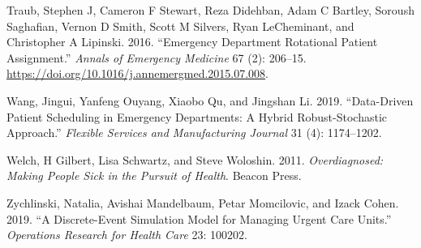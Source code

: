 \documentclass{article}
\newlength{\cslhangindent}
\newlength{\cslentryspacingunit} %
\newenvironment{CSLReferences}[2] %
 {%
  \setlength{\parindent}{0pt}
  \ifodd #1
  \let\oldpar\par
  \def\par{\hangindent=\cslhangindent\oldpar}
  \fi
  \setlength{\parskip}{#2\cslentryspacingunit}
 }%
 {}
\begin{document}
\begin{CSLReferences}{1}{0}
\leavevmode{}%
Traub, Stephen J, Cameron F Stewart, Reza Didehban, Adam C Bartley,
Soroush Saghafian, Vernon D Smith, Scott M Silvers, Ryan LeCheminant,
and Christopher A Lipinski. 2016. {``Emergency Department Rotational
Patient Assignment.''} \emph{Annals of Emergency Medicine} 67 (2):
206--15. \url{https://doi.org/10.1016/j.annemergmed.2015.07.008}.

\leavevmode{}%
Wang, Jingui, Yanfeng Ouyang, Xiaobo Qu, and Jingshan Li. 2019.
{``Data-Driven Patient Scheduling in Emergency Departments: A Hybrid
Robust-Stochastic Approach.''} \emph{Flexible Services and Manufacturing
Journal} 31 (4): 1174--1202.

\leavevmode{}%
Welch, H Gilbert, Lisa Schwartz, and Steve Woloshin. 2011.
\emph{Overdiagnosed: Making People Sick in the Pursuit of Health}.
Beacon Press.

\leavevmode{}%
Zychlinski, Natalia, Avishai Mandelbaum, Petar Momcilovic, and Izack
Cohen. 2019. {``A Discrete-Event Simulation Model for Managing Urgent
Care Units.''} \emph{Operations Research for Health Care} 23: 100202.

\end{CSLReferences}



\end{document}
